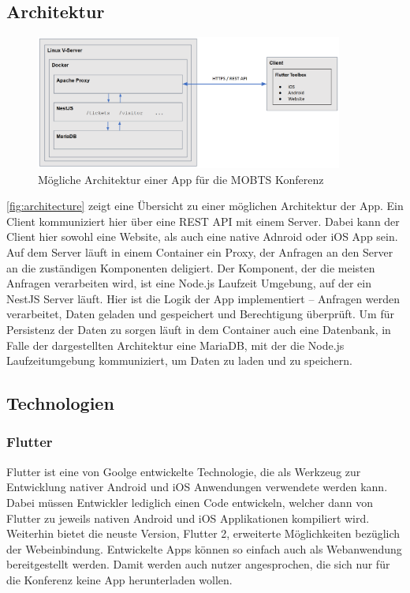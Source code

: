 \subsection{Architektur}
\begin{figure}[h]
    \begin{center}
        \includegraphics[width=0.9\textwidth]{img/app_architecture.PNG}
    \end{center}
    \caption{Mögliche Architektur einer App für die MOBTS Konferenz}
    \label{fig:architecture}
\end{figure}

\autoref{fig:architecture} zeigt eine Übersicht zu einer möglichen Architektur der App.
Ein Client kommuniziert hier über eine \ac{REST} \ac{API} mit einem Server.
Dabei kann der Client hier sowohl eine Website, als auch eine native Adnroid oder iOS App sein.
Auf dem Server läuft in einem Container ein Proxy, der Anfragen an den Server an die zuständigen Komponenten deligiert.
Der Komponent, der die meisten Anfragen verarbeiten wird, ist eine Node.js Laufzeit Umgebung, auf der ein NestJS Server läuft.
Hier ist die Logik der App implementiert -- Anfragen werden verarbeitet, Daten geladen und gespeichert und Berechtigung überprüft.
Um für Persistenz der Daten zu sorgen läuft in dem Container auch eine Datenbank, in Falle der dargestellten Architektur eine MariaDB, mit der die Node.js Laufzeitumgebung kommuniziert, um Daten zu laden und zu speichern.

\subsection{Technologien}
\subsubsection*{Flutter}
Flutter ist eine von Goolge entwickelte Technologie, die als Werkzeug zur Entwicklung nativer Android und iOS Anwendungen verwendete werden kann.
Dabei müssen Entwickler lediglich einen Code entwickeln, welcher dann von Flutter zu jeweils nativen Android und iOS Applikationen kompiliert wird.
Weiterhin bietet die neuste Version, Flutter 2, erweiterte Möglichkeiten bezüglich der Webeinbindung.
Entwickelte Apps können so einfach auch als Webanwendung bereitgestellt werden.
Damit werden auch nutzer angesprochen, die sich nur für die Konferenz keine App herunterladen wollen. \autocite{B_GoogleDevelopers.} 

